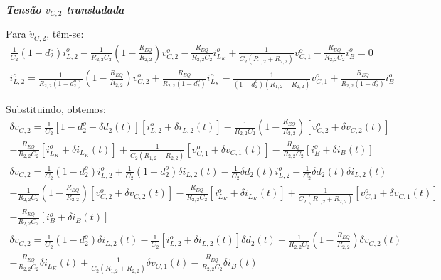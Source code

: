\documentclass{article}
\begin{document}
\textbf{\textit{Tensão $v_{C,2}$ transladada}} \vspace*{12pt}

Para $\dot{v}_{C,2}$, têm-se:
\begin{gather*}
  \frac{1}{C_2} \left(1 - d_2^o\right) i_{L,2}^o - \frac{1}{R_{2,2}C_2} \left(1 - \frac{R_{EQ}}{R_{2,2}}\right) v_{C,2}^o - \frac{R_{EQ}}{R_{2,2} C_2} i_{L_K}^o + \frac{1}{C_2(R_{1,2} + R_{2,2})} v_{C,1}^o - \frac{R_{EQ}}{R_{2,2}C_2} i_B^o= 0
\end{gather*}
\begin{gather}
  i_{L,2}^o = \frac{1}{R_{2,2} \left(1 - d_2^o\right)} \left(1 - \frac{R_{EQ}}{R_{2,2}}\right) v_{C,2}^o + \frac{R_{EQ}}{R_{2,2} \left(1 - d_2^o\right)} i_{L_K}^o - \frac{1}{\left(1 - d_2^o\right) (R_{1,2} + R_{2,2})} v_{C,1}^o + \frac{R_{EQ}}{R_{2,2}\left(1 - d_2^o\right)} i_B^o
\end{gather}

Substituindo, obtemos:
\begin{multline*}
  \delta \dot v_{C,2} = \frac{1}{C_2} \left[1 - d_2^o - \delta d_2(t)\right] \left[i_{L,2}^o + \delta i_{L,2}(t)\right]
  - \frac{1}{R_{2,2}C_2} \left(1 - \frac{R_{EQ}}{R_{2,2}}\right) \left[v_{C,2}^o + \delta v_{C,2}(t)\right] \\
  - \frac{R_{EQ}}{R_{2,2} C_2} \left[i_{L_K}^o + \delta i_{L_K}(t)\right] + \frac{1}{C_2(R_{1,2} + R_{2,2})} \left[v_{C,1}^o + \delta v_{C,1}(t)\right] - \frac{R_{EQ}}{R_{2,2} C_2} \left[i_B^o + \delta i_B(t)\right]
\end{multline*}
\begin{multline*}
  \delta \dot v_{C,2} = \frac{1}{C_2} (1 - d_2^o) i_{L,2}^o + \frac{1}{C_2} (1 - d_2^o) \delta i_{L,2}(t) - \frac{1}{C_2} \delta d_2(t) i_{L,2}^o - \frac{1}{C_2} \delta d_2(t) \delta i_{L,2}(t)\\
  - \frac{1}{R_{2,2}C_2} \left(1 - \frac{R_{EQ}}{R_{2,2}}\right) \left[v_{C,2}^o + \delta v_{C,2}(t)\right]
  - \frac{R_{EQ}}{R_{2,2} C_2} \left[i_{L_K}^o + \delta i_{L_K}(t)\right] + \frac{1}{C_2(R_{1,2} + R_{2,2})} \left[v_{C,1}^o + \delta v_{C,1}(t)\right] \\
  - \frac{R_{EQ}}{R_{2,2} C_2} \left[i_B^o + \delta i_B(t)\right]
\end{multline*}
\begin{multline*}
  \delta \dot v_{C,2} = \frac{1}{C_2} (1 - d_2^o) \delta i_{L,2}(t) - \frac{1}{C_2} \left[i_{L,2}^o + \delta i_{L,2}(t)\right] \delta d_2(t)
  - \frac{1}{R_{2,2}C_2} \left(1 - \frac{R_{EQ}}{R_{2,2}}\right) \delta v_{C,2}(t)  \\
  - \frac{R_{EQ}}{R_{2,2} C_2} \delta i_{L_K}(t) + \frac{1}{C_2(R_{1,2} + R_{2,2})}  \delta v_{C,1}(t) - \frac{R_{EQ}}{R_{2,2} C_2} \delta i_B(t)
\end{multline*}
\end{document}
